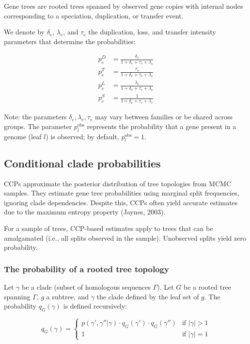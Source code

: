 Gene trees are rooted trees spanned by observed gene copies with internal nodes corresponding to a speciation, duplication, or transfer event.

We denote by $\delta_e$, $\lambda_e$, and $\tau_e$ the duplication, loss, and transfer intensity parameters that determine the probabilities:

\begin{align}
  p^D_e &= \frac{\delta_e}{1 + \delta_e + \tau_e + \lambda_e} \\
  p^T_e &= \frac{\tau_e}{1 + \delta_e + \tau_e + \lambda_e} \\
  p^L_e &= \frac{\lambda_e}{1 + \delta_e + \tau_e + \lambda_e} \\
  p^S_e &= \frac{1}{1 + \delta_e + \tau_e + \lambda_e}
\end{align}

Note: the parameters $\delta_e, \lambda_e, \tau_e$ may vary between families or be shared across groups.  
The parameter $p^{\text{obs}}_l$ represents the probability that a gene present in a genome (leaf $l$) is observed; by default, $p^{\text{obs}}_l = 1$.

\subsection{Conditional clade probabilities}

CCPs approximate the posterior distribution of tree topologies from MCMC samples.  
They estimate gene tree probabilities using marginal split frequencies, ignoring clade dependencies.  
Despite this, CCPs often yield accurate estimates due to the maximum entropy property (Jaynes, 2003).

For a sample of trees, CCP-based estimates apply to trees that can be amalgamated (i.e., all splits observed in the sample).  
Unobserved splits yield zero probability.

\subsubsection{The probability of a rooted tree topology}

Let $\gamma$ be a clade (subset of homologous sequences $\Gamma$). Let $G$ be a rooted tree spanning $\Gamma$, $g$ a subtree, and $\gamma$ the clade defined by the leaf set of $g$.  
The probability $q_G(\gamma)$ is defined recursively:

\[
q_G(\gamma) = 
\begin{cases}
  p(\gamma', \gamma'' | \gamma) \cdot q_G(\gamma') \cdot q_G(\gamma'') & \text{if } |\gamma| > 1 \\
  1 & \text{if } |\gamma| = 1
\end{cases}
\]

